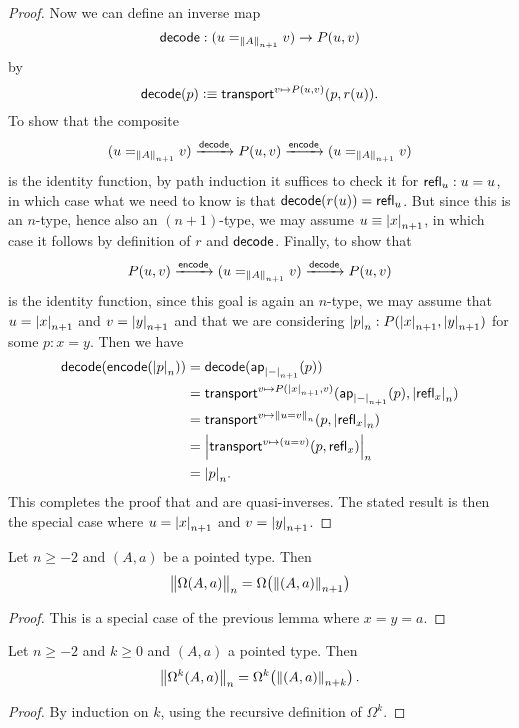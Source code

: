 \begin{proof}
  Now we can define an inverse map
  \[\decode: (u=_{\trunc{n+1}A}v) \to P(u,v)\]
  by
  \[\decode(p) \defeq \transfib{v\mapsto P(u,v)}{p}{r(u)}. \]
  To show that the composite
  \[ (u=_{\trunc{n+1}A}v) \xrightarrow{\decode} P(u,v) \xrightarrow{\encode} (u=_{\trunc{n+1}A}v) \]
  is the identity function, by path induction it suffices to check it for $\refl u : u=u$, in which case what we need to know is that
$\decode(r(u)) = \refl{u}$.
  But since this is an $n$-type, hence also an $(n+1)$-type, we may assume $u\jdeq \tproj {n+1} x$, in which case it follows by definition
of $r$ and $\decode$.
  Finally, to show that 
  \[ P(u,v) \xrightarrow{\encode} (u=_{\trunc{n+1}A}v) \xrightarrow{\decode} P(u,v) \]
  is the identity function, since this goal is again an $n$-type, we may assume that $u=\tproj {n+1}x$ and $v=\tproj {n+1}y$ and that we are
considering $\tproj n p:P(\tproj{n+1}x,\tproj{n+1}y)$ for some $p:x=y$.
  Then we have
  \begin{align*}
    \decode(\encode(\tproj n p)) &= \decode(\apfunc{\tproj{n+1}-}(p))\\
    &= \transfib{v\mapsto P(\tproj{n+1}x,v)}{\apfunc{\tproj{n+1}-}(p)}{\tproj n {\refl x}}\\
    &= \transfib{v\mapsto \trunc n{u=v}}{p}{\tproj n {\refl x}}\\
    &= \tproj n {\transfib{v \mapsto (u=v)}{p}{\refl x}}\\
    &= \tproj n p.
  \end{align*}
  This completes the proof that \encode and \decode are quasi-inverses.
  The stated result is then the special case where $u=\tproj {n+1}x$ and $v=\tproj {n+1}y$.
\end{proof}

\begin{cor}
  Let $n\ge-2$ and $(A,a)$ be a pointed type. Then
  \[\ttrunc n{\Omega(A,a)}=\Omega\mathopen{}\left(\trunc{n+1}{(A,a)}\right)\]
\end{cor}
\begin{proof}
  This is a special case of the previous lemma where $x=y=a$.
\end{proof}

\begin{cor}
  Let $n\ge -2$ and $k\ge 0$ and $(A,a)$ a pointed type.  Then
  \[\ttrunc n{\Omega^k(A,a)} = \Omega^k\mathopen{}\left(\trunc{n+k}{(A,a)}\right). \]
\end{cor}
\begin{proof}
  By induction on $k$, using the recursive definition of $\Omega^k$.
\end{proof}


